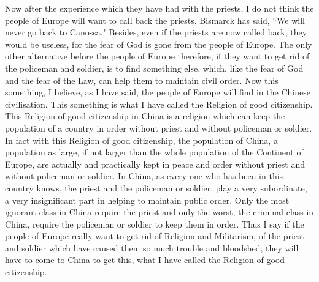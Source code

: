 Now after the experience which they have had with the priests, I do not think the people of Europe will want to call back the priests.
Bismarck has said, ``We will never go back to Canossa."
Besides, even if the priests are now called back, they would be useless, for the fear of God is gone from the people of Europe.
The only other alternative before the people of Europe therefore, if they want to get rid of the policeman and soldier, is to find something else, which, like the fear of God and the fear of the Law, can help them to maintain civil order.
Now this something, I believe, as I have said, the people of Europe will find in the Chinese civilisation.
This something is what I have called the Religion of good citizenship.
This Religion of good citizenship in China is a religion which can keep the population of a country in order without priest and without policeman or soldier.
In fact with this Religion of good citizenship, the population of China, a population as large, if not larger than the whole population of the Continent of Europe, are actually and practically kept in peace and order without priest and without policeman or soldier.
In China, as every one who has been in this country knows, the priest and the policeman or soldier, play a very subordinate, a very insignificant part in helping to maintain public order.
Only the most ignorant class in China require the priest and only the worst, the criminal class in China, require the policeman or soldier to keep them in order.
Thus I say if the people of Europe really want to get rid of Religion and Militarism, of the priest and soldier which have caused them so much trouble and bloodshed, they will have to come to China to get this, what I have called the Religion of good citizenship.

